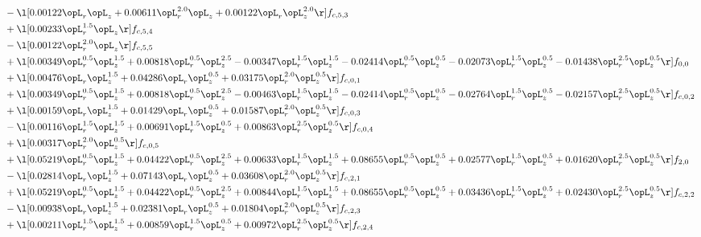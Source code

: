 \begin{alignat}{2}
& - \l[  0.00122 \opL_r \opL_z +  0.00611 \opL_r^{2.0} \opL_z +  0.00122 \opL_r \opL_z^{2.0}  \r] f_{c,5,3} \nonumber \\ 
& + \l[  0.00233 \opL_r^{1.5} \opL_z  \r] f_{c,5,4} \nonumber \\ 
& - \l[  0.00122 \opL_r^{2.0} \opL_z  \r] f_{c,5,5} \nonumber \\ 
& + \l[  0.00349 \opL_r^{0.5} \opL_z^{1.5} +  0.00818 \opL_r^{0.5} \opL_z^{2.5}   -0.00347 \opL_r^{1.5} \opL_z^{1.5}   -0.02414 \opL_r^{0.5} \opL_z^{0.5}   -0.02073 \opL_r^{1.5} \opL_z^{0.5}   -0.01438 \opL_r^{2.5} \opL_z^{0.5}  \r] f_{0,0} \nonumber \\ 
& + \l[  0.00476 \opL_r \opL_z^{1.5} +  0.04286 \opL_r \opL_z^{0.5} +  0.03175 \opL_r^{2.0} \opL_z^{0.5}  \r] f_{c,0,1} \nonumber \\ 
& + \l[  0.00349 \opL_r^{0.5} \opL_z^{1.5} +  0.00818 \opL_r^{0.5} \opL_z^{2.5}   -0.00463 \opL_r^{1.5} \opL_z^{1.5}   -0.02414 \opL_r^{0.5} \opL_z^{0.5}   -0.02764 \opL_r^{1.5} \opL_z^{0.5}   -0.02157 \opL_r^{2.5} \opL_z^{0.5}  \r] f_{c,0,2} \nonumber \\ 
& + \l[  0.00159 \opL_r \opL_z^{1.5} +  0.01429 \opL_r \opL_z^{0.5} +  0.01587 \opL_r^{2.0} \opL_z^{0.5}  \r] f_{c,0,3} \nonumber \\ 
& - \l[  0.00116 \opL_r^{1.5} \opL_z^{1.5} +  0.00691 \opL_r^{1.5} \opL_z^{0.5} +  0.00863 \opL_r^{2.5} \opL_z^{0.5}  \r] f_{c,0,4} \nonumber \\ 
& + \l[  0.00317 \opL_r^{2.0} \opL_z^{0.5}  \r] f_{c,0,5} \nonumber \\ 
& + \l[  0.05219 \opL_r^{0.5} \opL_z^{1.5} +  0.04422 \opL_r^{0.5} \opL_z^{2.5} +  0.00633 \opL_r^{1.5} \opL_z^{1.5} +  0.08655 \opL_r^{0.5} \opL_z^{0.5} +  0.02577 \opL_r^{1.5} \opL_z^{0.5} +  0.01620 \opL_r^{2.5} \opL_z^{0.5}  \r] f_{2,0} \nonumber \\ 
& - \l[  0.02814 \opL_r \opL_z^{1.5} +  0.07143 \opL_r \opL_z^{0.5} +  0.03608 \opL_r^{2.0} \opL_z^{0.5}  \r] f_{c,2,1} \nonumber \\ 
& + \l[  0.05219 \opL_r^{0.5} \opL_z^{1.5} +  0.04422 \opL_r^{0.5} \opL_z^{2.5} +  0.00844 \opL_r^{1.5} \opL_z^{1.5} +  0.08655 \opL_r^{0.5} \opL_z^{0.5} +  0.03436 \opL_r^{1.5} \opL_z^{0.5} +  0.02430 \opL_r^{2.5} \opL_z^{0.5}  \r] f_{c,2,2} \nonumber \\ 
& - \l[  0.00938 \opL_r \opL_z^{1.5} +  0.02381 \opL_r \opL_z^{0.5} +  0.01804 \opL_r^{2.0} \opL_z^{0.5}  \r] f_{c,2,3} \nonumber \\ 
& + \l[  0.00211 \opL_r^{1.5} \opL_z^{1.5} +  0.00859 \opL_r^{1.5} \opL_z^{0.5} +  0.00972 \opL_r^{2.5} \opL_z^{0.5}  \r] f_{c,2,4} \nonumber \\ 

\end{alignat}
